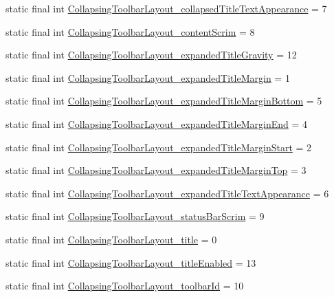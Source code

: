 \begin{DoxyCompactItemize}
\item 
static final int \hyperlink{classcheck_1_1test_1_1_r_1_1styleable_af8c6af1685175b4f7441abd8ac238f71}{Collapsing\+Toolbar\+Layout\+\_\+collapsed\+Title\+Text\+Appearance} = 7
\item 
static final int \hyperlink{classcheck_1_1test_1_1_r_1_1styleable_aafa0dc99209d496d21b18f2db67597f1}{Collapsing\+Toolbar\+Layout\+\_\+content\+Scrim} = 8
\item 
static final int \hyperlink{classcheck_1_1test_1_1_r_1_1styleable_a111ed46d59211ccdd56c892aa2be9eb6}{Collapsing\+Toolbar\+Layout\+\_\+expanded\+Title\+Gravity} = 12
\item 
static final int \hyperlink{classcheck_1_1test_1_1_r_1_1styleable_ab6768f81043a9099ccaa6b71b1e063b7}{Collapsing\+Toolbar\+Layout\+\_\+expanded\+Title\+Margin} = 1
\item 
static final int \hyperlink{classcheck_1_1test_1_1_r_1_1styleable_afd2cccb26f6d0c7f231c62cd008c5963}{Collapsing\+Toolbar\+Layout\+\_\+expanded\+Title\+Margin\+Bottom} = 5
\item 
static final int \hyperlink{classcheck_1_1test_1_1_r_1_1styleable_a7c45bb4250b94c50e63037e285cbce79}{Collapsing\+Toolbar\+Layout\+\_\+expanded\+Title\+Margin\+End} = 4
\item 
static final int \hyperlink{classcheck_1_1test_1_1_r_1_1styleable_a9998f98d1bc4ccd614b3102b27346107}{Collapsing\+Toolbar\+Layout\+\_\+expanded\+Title\+Margin\+Start} = 2
\item 
static final int \hyperlink{classcheck_1_1test_1_1_r_1_1styleable_a33f7e13e75737dc7d53feb23164abfcf}{Collapsing\+Toolbar\+Layout\+\_\+expanded\+Title\+Margin\+Top} = 3
\item 
static final int \hyperlink{classcheck_1_1test_1_1_r_1_1styleable_a01bf5ec327b8ed9194b323abcf3f914c}{Collapsing\+Toolbar\+Layout\+\_\+expanded\+Title\+Text\+Appearance} = 6
\item 
static final int \hyperlink{classcheck_1_1test_1_1_r_1_1styleable_a2475ffb2f49d975dd9c976b973c3385f}{Collapsing\+Toolbar\+Layout\+\_\+status\+Bar\+Scrim} = 9
\item 
static final int \hyperlink{classcheck_1_1test_1_1_r_1_1styleable_af9921604bea0ce807ca10fd495eb7f48}{Collapsing\+Toolbar\+Layout\+\_\+title} = 0
\item 
static final int \hyperlink{classcheck_1_1test_1_1_r_1_1styleable_ab762976306f550b00c8cb1c7ed31cd44}{Collapsing\+Toolbar\+Layout\+\_\+title\+Enabled} = 13
\item 
static final int \hyperlink{classcheck_1_1test_1_1_r_1_1styleable_ab00225a14bdf82c12e0532781e9bb655}{Collapsing\+Toolbar\+Layout\+\_\+toolbar\+Id} = 10

\end{DoxyCompactItemize}

